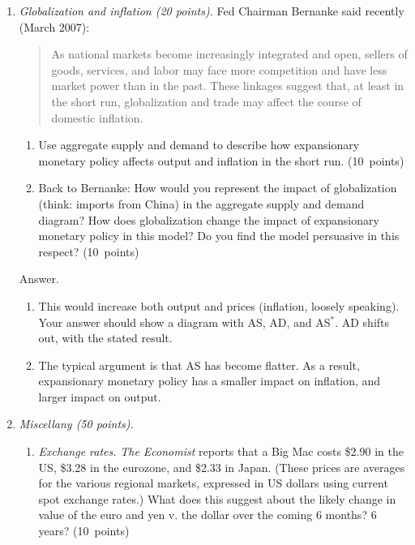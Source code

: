 \documentclass[letterpaper,12pt]{article}
\begin{document}
\begin{enumerate}
\item {\it Globalization and inflation (20 points).\/}
Fed Chairman Bernanke said recently (March 2007):  
\begin{quote}
As national markets become increasingly integrated and open, sellers of goods, services, and labor may face more competition and have less market power than in the past. 
These linkages suggest that, at least in the short run, globalization and trade may affect the course of domestic inflation.
\end{quote}
%
\begin{enumerate}
\item Use aggregate supply and demand to 
describe how expansionary monetary policy 
affects output and inflation in the short run.  
(10~points)

\item Back to Bernanke:  How would you represent the impact of 
globalization (think:  imports from China) 
in the aggregate supply and demand diagram?  
How does globalization change the impact of expansionary monetary 
policy in this model?
Do you find the model persuasive in this respect?  
(10~points)
\end{enumerate}


Answer.
\begin{enumerate}
\item This would increase both output and prices (inflation, 
loosely speaking).  Your answer should show a diagram with 
AS, AD, and AS$^*$.
AD shifts out, with the stated result.  

\item The typical argument is that AS has become flatter.
As a result, expansionary monetary policy has a 
smaller impact on inflation, and larger impact on output. 

\end{enumerate}



\item {\it Miscellany (50 points).}

\begin{enumerate}

\item {\it Exchange rates.\/}
{\it The Economist\/} reports that a Big Mac costs \$2.90 in the US, \$3.28 in the eurozone,
and \$2.33 in Japan.  (These prices are averages for the various regional markets, expressed in US
dollars using current spot exchange rates.)  What does this suggest about the likely change in
value of the euro and yen v. the dollar over the coming 6 months?  6 years? (10~points)  


\end{enumerate}
\end{enumerate}
\end{document}
